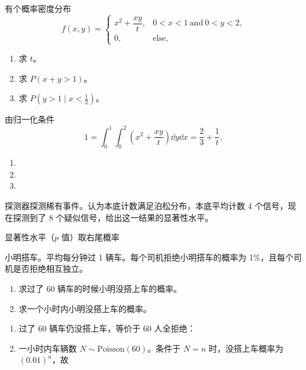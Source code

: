 \begin{question}
有个概率密度分布
\[
f(x,y)=\begin{cases}
x^2+\dfrac{xy}{t},&0<x<1\ \text{and}\ 0<y<2,\\
0,&\text{else},
\end{cases}
\]
\begin{enumerate}[label=(\alph*),leftmargin=2.8em,itemsep=0.2em]
\item 求 $t$。
\item 求 $P(x+y>1)$。
\item 求 $P(y>1\mid x<\frac12)$。
\end{enumerate}
\begin{solution}
由归一化条件
\[
1=\int_0^1\int_0^2\left(x^2+\frac{xy}{t}\right)\dd{y}\dd{x}
=\frac23+\frac1t,
\]
\begin{enumerate}[label=(\arabic*),leftmargin=2.8em,itemsep=0.2em]
\item {}
\item
{}
\item
{}
\end{enumerate}
\end{solution}
\end{question}

\begin{question}
探测器探测稀有事件。认为本底计数满足泊松分布，本底平均计数 4 个信号，现在探测到了 8 个疑似信号，给出这一结果的显著性水平。
\begin{solution}
显著性水平（$p$ 值）取右尾概率
\end{solution}
\end{question}

\begin{question}
小明搭车。平均每分钟过 1 辆车。每个司机拒绝小明搭车的概率为 1\%，且每个司机是否拒绝相互独立。
\begin{enumerate}[label=(\alph*),leftmargin=2.8em,itemsep=0.2em]
\item 求过了 60 辆车的时候小明没搭上车的概率。
\item 求一个小时内小明没搭上车的概率。
\end{enumerate}
\begin{solution}
\begin{enumerate}[label=(\arabic*),leftmargin=2.8em,itemsep=0.2em]
\item 过了 $60$ 辆车仍没搭上车，等价于 $60$ 人全拒绝：
\item 一小时内车辆数 $N\sim \mathrm{Poisson}(60)$。条件于 $N=n$ 时，没搭上车概率为 $(0.01)^n$，故
\end{enumerate}
\end{solution}
\end{question}


